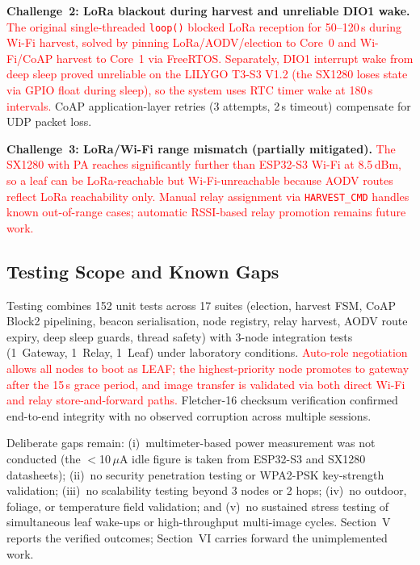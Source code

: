\documentclass[12pt,a4paper]{article}
\newcommand{\changed}[1]{\textcolor{red}{#1}}
\begin{document}
\textbf{Challenge~2: LoRa blackout during harvest and unreliable DIO1 wake.} \changed{The original single-threaded \texttt{loop()} blocked LoRa reception for 50--120\,s during Wi-Fi harvest, solved by pinning LoRa/AODV/election to Core~0 and Wi-Fi/CoAP harvest to Core~1 via FreeRTOS. Separately, DIO1 interrupt wake from deep sleep proved unreliable on the LILYGO T3-S3 V1.2 (the SX1280 loses state via GPIO float during sleep), so the system uses RTC timer wake at 180\,s intervals.} CoAP application-layer retries (3 attempts, 2\,s timeout) compensate for UDP packet loss.

\textbf{Challenge~3: LoRa/Wi-Fi range mismatch (partially mitigated).} \changed{The SX1280 with PA reaches significantly further than ESP32-S3 Wi-Fi at 8.5\,dBm, so a leaf can be LoRa-reachable but Wi-Fi-unreachable because AODV routes reflect LoRa reachability only. Manual relay assignment via \texttt{HARVEST\_CMD} handles known out-of-range cases; automatic RSSI-based relay promotion remains future work.}

\subsection{Testing Scope and Known Gaps}

Testing combines 152 unit tests across 17 suites (election, harvest FSM, CoAP Block2 pipelining, beacon serialisation, node registry, relay harvest, AODV route expiry, deep sleep guards, thread safety) with 3-node integration tests (1~Gateway, 1~Relay, 1~Leaf) under laboratory conditions. \changed{Auto-role negotiation allows all nodes to boot as LEAF; the highest-priority node promotes to gateway after the 15\,s grace period, and image transfer is validated via both direct Wi-Fi and relay store-and-forward paths.} Fletcher-16 checksum verification confirmed end-to-end integrity with no observed corruption across multiple sessions.

Deliberate gaps remain: (i)~multimeter-based power measurement was not conducted (the $<$10\,$\mu$A idle figure is taken from ESP32-S3 and SX1280 datasheets); (ii)~no security penetration testing or WPA2-PSK key-strength validation; (iii)~no scalability testing beyond 3 nodes or 2 hops; (iv)~no outdoor, foliage, or temperature field validation; and (v)~no sustained stress testing of simultaneous leaf wake-ups or high-throughput multi-image cycles. Section~V reports the verified outcomes; Section~VI carries forward the unimplemented work.

\newpage
\end{document}
